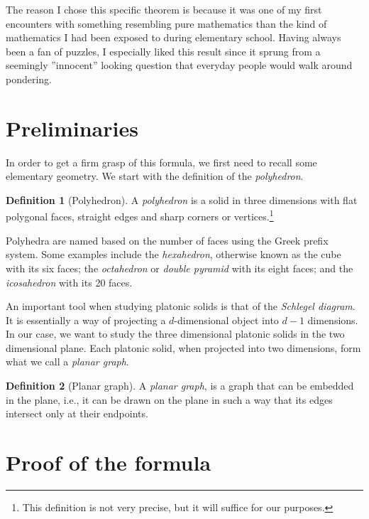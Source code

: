 \documentclass{amsart}
\theoremstyle{plain}
\theoremstyle{definition}
\newtheorem{definition}{Definition}
\begin{document}
The reason I chose this specific theorem is because it was one of my first
encounters with something resembling pure mathematics than the kind of
mathematics I had been exposed to during elementary school. Having always been
a fan of puzzles, I especially liked this result since it sprung from a
seemingly ''innocent'' looking question that everyday people would walk around
pondering.
 
\section{Preliminaries}
\label{sec:preliminaries}

In order to get a firm grasp of this formula, we first need to recall some
elementary geometry.  We start with the definition of the \emph{polyhedron}.

\begin{definition}[Polyhedron]
    A \emph{polyhedron} is a solid in three dimensions with flat polygonal
    faces, straight edges and sharp corners or vertices.\footnote{This
    definition is not very precise, but it will suffice for our purposes.}
\end{definition}

Polyhedra are named based on the number of faces using the Greek prefix system.
Some examples include the \emph{hexahedron}, otherwise known as the cube with
its six faces; the \emph{octahedron} or \emph{double pyramid} with its eight
faces; and the \emph{icosahedron} with its 20 faces.

An important tool when studying platonic solids is that of the \emph{Schlegel
diagram}. It is essentially a way of projecting a $d$-dimensional object into
$d-1$ dimensions. In our case, we want to study the three dimensional platonic
solids in the two dimensional plane. Each platonic solid, when projected into
two dimensions, form what we call a \emph{planar graph}.

\begin{definition}[Planar graph]
  A \emph{planar graph}, is a graph that can be embedded in the plane, i.e., it
  can be drawn on the plane in such a way that its edges intersect only at
  their endpoints.
\end{definition}

\section{Proof of the formula}
\label{sec:proof_of_the_formula}
\end{document}
